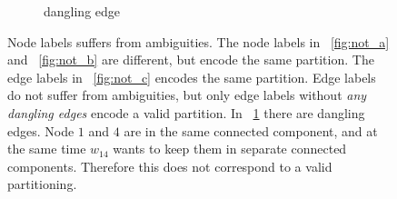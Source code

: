 \begin{center}
\begin{figure}[h]
\begin{tiny}
\begin{subfigure}[t]{0.22\linewidth}
{    }
\caption{ \tiny{dangling edge}}
\label{fig:not_d}
\end{subfigure}
\end{tiny}
\caption{
Node labels suffers from ambiguities.
The node labels in
~\ref{fig:not_a} and ~\ref{fig:not_b} are
different, but encode the same partition.
The edge labels in ~\ref{fig:not_c}
encodes the same partition. Edge
labels do not suffer from ambiguities, but only
edge labels without \emph{any dangling edges}
encode a valid partition. In ~\ref{fig:not_d}
there are dangling edges. Node $1$ and $4$
are in the same connected component,
and at the same time $w_{14}$ wants to keep
them in separate connected components.
Therefore this does
not correspond to a valid partitioning.
}\label{fig:notation}
\end{figure}
\end{center}

